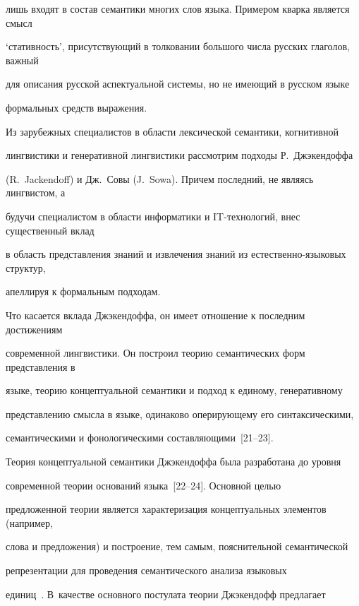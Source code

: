 лишь входят в состав семантики многих слов языка. Примером кварка является смысл 


`стативность', присутствующий в толковании большого числа русских глаголов, важный 


для описания русской аспектуальной системы, но не имеющий в русском языке 


формальных средств выражения.


   


   Из зарубежных специалистов в области лексической семантики, когнитивной 


лингвистики и генеративной лингвистики рассмотрим подходы Р.~Джэкендоффа 


(R.~Jackendoff) и Дж.~Совы (J.~Sowa). Причем последний, не являясь лингвистом, а 


будучи специалистом в области информатики и IT-технологий, внес существенный вклад 


в область представления знаний и извлечения знаний из естественно-языковых структур, 


апеллируя к формальным подходам.


   


   Что касается вклада Джэкендоффа, он имеет отношение к последним достижениям 


современной лингвистики. Он построил теорию семантических форм представления в 


языке, теорию концептуальной семантики и подход к единому, генеративному 


представлению смысла в языке, одинаково оперирующему его синтаксическими, 


семантическими и фонологическими составляющими~[21--23]. 


   


Теория концептуальной семантики Джэкендоффа была разработана до уровня 


современной теории оснований языка~[22--24]. Основной целью 


предложенной теории является характеризация концептуальных элементов (например, 


слова и предложения) и построение, тем самым, пояснительной семантической 


репрезентации для проведения семантического анализа языковых 


единиц~\cite{21-2-11}. В~качестве основного постулата теории Джэкендофф предлагает 


